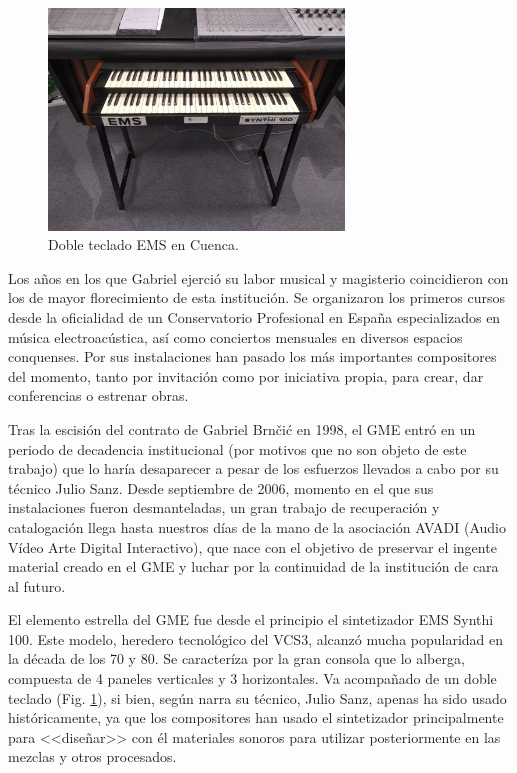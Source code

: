\begin{figure}
	\centering
	\includegraphics[width=0.7\textwidth]{teclado_EMS}
	\caption[Doble teclado EMS en Cuenca.]{Doble teclado EMS en Cuenca.}
	\label{fig:teclado_EMS}
\end{figure}

Los años en los que Gabriel ejerció su labor musical y magisterio coincidieron con los de mayor florecimiento de esta institución. Se organizaron los primeros cursos desde la oficialidad de un Conservatorio Profesional en España especializados en música electroacústica, así como conciertos mensuales en diversos espacios conquenses. Por sus instalaciones han pasado los más importantes compositores del momento, tanto por invitación como por iniciativa propia, para crear, dar conferencias o estrenar obras.

Tras la escisión del contrato de Gabriel Brnčić en 1998, el GME entró en un periodo de decadencia institucional (por motivos que no son objeto de este trabajo) que lo haría desaparecer a pesar de los esfuerzos llevados a cabo por su técnico Julio Sanz. Desde septiembre de 2006, momento en el que sus instalaciones fueron desmanteladas, un gran trabajo de recuperación y catalogación llega hasta nuestros días de la mano de la asociación AVADI (Audio Vídeo Arte Digital Interactivo), que nace con el objetivo de preservar el ingente material creado en el GME y luchar por la continuidad de la institución de cara al futuro. 

El elemento estrella del GME fue desde el principio el sintetizador EMS Synthi 100. Este modelo, heredero tecnológico del VCS3, alcanzó mucha popularidad en la década de los 70 y 80. Se caracteríza por la gran consola que lo alberga, compuesta de 4 paneles verticales y 3 horizontales. Va acompañado de un doble teclado (Fig. \ref{fig:teclado_EMS}), si bien, según narra su técnico, Julio Sanz, apenas ha sido usado históricamente, ya que los compositores han usado el sintetizador principalmente para <<diseñar>> con él materiales sonoros para utilizar posteriormente en las mezclas y otros procesados.

